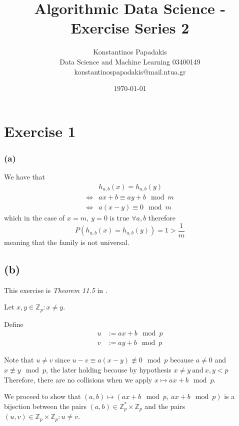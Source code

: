 \documentclass{article}
\title{Algorithmic Data Science - Exercise Series 2}
\author{
    Konstantinos Papadakis\\
    Data Science and Machine Learning 03400149\\
    konstantinospapadakis@mail.ntua.gr
}
\date{\today}
\begin{document}
\maketitle
\newpage

\section*{Exercise 1}

\subsubsection*{(a)}
We have that 
\begin{align*}
    &h_{a,b}(x) = h_{a,b}(y)\\
    \iff& ax + b \equiv ay + b \mod{m}\\
    \iff& a(x-y) \equiv 0 \mod{m}
\end{align*}
which in the case of \(x=m, \  y = 0\) is true \(\forall a, b\)
therefore
\[P(h_{a,b}(x) = h_{a,b}(y)) = 1 > \frac{1}{m}\]
meaning that the family is not universal.

\subsection*{(b)}

This exercise is \emph{Theorem 11.5} in \cite{clrs}.

Let \(x, y \in \mathbb{Z}_p: x \neq y\).

Define
\begin{align*}
    u &:= ax + b \mod{p}\\
    v &:= ay + b \mod{p}
\end{align*}

Note that \(u \neq v\)
since \(u - v \equiv a (x - y) \not\equiv 0 \mod{p}\)
because \(a \neq 0\) and \(x \not\equiv y \mod{p}\),
the later holding because by hypothesis \(x \neq y \ \textrm{and}\ x,y < p\)
Therefore, there are no collisions when we apply \(x \mapsto ax + b \mod{p}\).

We proceed to show that
\((a, b) \mapsto (ax + b \mod{p},\ ax + b \mod{p})\) is a bijection between
the pairs \((a, b) \in \mathbb{Z}_p^* \times \mathbb{Z}_p\)
and the pairs \((u, v) \in \mathbb{Z}_p \times \mathbb{Z}_p: u \neq v\).
\end{document}

